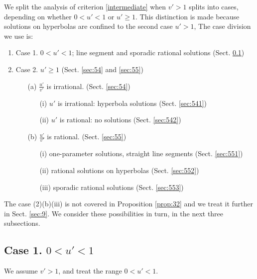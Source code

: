 \documentclass[12pt,letterpaper, reqno]{amsart}
\theoremstyle{definition}
\theoremstyle{remark}
\newcommand{\uu}{{u'}}
\newcommand{\vv}{{v'}}
\begin{document}
We split the  analysis of criterion \eqref{intermediate} when $\vv>1$   splits into cases, 
depending on whether $0 < {\uu} <1$ or ${\uu}\ge 1$. 
This distinction is made because 
solutions on hyperbolas are confined to  the second case  ${\uu}>1$,
 The case division we use is:
\begin{enumerate}
\item
Case 1. $0 < {\uu} <1$; line segment and sporadic rational solutions (Sect. \ref{sec:53})
\item
Case 2. $ {\uu} \ge 1$  (Sect. \ref{sec:54} and \ref{sec:55})
\begin{enumerate}
\item[(a)]
$\frac{\uu}{\vv}$ is irrational. (Sect. \ref{sec:54})
\begin{enumerate}
\item[(i)]
$\uu$ is irrational: hyperbola solutions (Sect. \ref{sec:541})
\item[(ii)]
 $\uu$ is rational: no solutions  (Sect. \ref{sec:542})
\end{enumerate}
\item[(b)]
$\frac{\uu}{\vv}$ is rational.  (Sect. \ref{sec:55})
\begin{enumerate}
\item[(i)]
one-parameter solutions, straight line segments  (Sect. \ref{sec:551})
\item[(ii)]
rational solutions on hyperbolas (Sect. \ref{sec:552})
\item[(iii)]
sporadic rational solutions  (Sect. \ref{sec:553})
\end{enumerate}
\end{enumerate}
\end{enumerate}
The case (2)(b)(iii) is not covered in   Proposition \ref{prop:32} and we 
treat it further in Sect. \ref{sec:9}.
We consider these possibilities in turn, in the next three subsections.


%
%
\subsection{Case 1. $0 < {\uu} <1$}\label{sec:53}

We assume ${\vv} >1$,
and treat the range $0 < {\uu} <1$.
\end{document}

